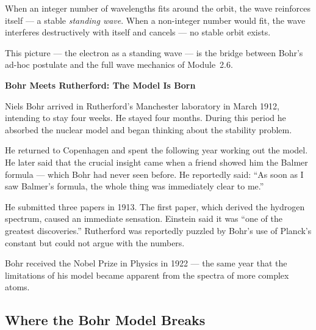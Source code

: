 \documentclass[12pt, a4paper]{book}
\newcommand{\newterm}[1]{\textit{\textcolor{DiscoveryColor}{#1}}}
\begin{document}
\vspace{0.5em}

When an integer number of wavelengths fits around the orbit,
the wave reinforces itself --- a stable \newterm{standing wave}.
When a non-integer number would fit, the wave interferes
destructively with itself and cancels --- no stable orbit exists.

This picture --- the electron as a standing wave ---
is the bridge between Bohr's ad-hoc postulate and the
full wave mechanics of Module~2.6.

\begin{historybox}
\textbf{Bohr Meets Rutherford: The Model Is Born}

Niels Bohr arrived in Rutherford's Manchester laboratory
in March 1912, intending to stay four weeks.
He stayed four months.
During this period he absorbed the nuclear model
and began thinking about the stability problem.

He returned to Copenhagen and spent the following year
working out the model.
He later said that the crucial insight came when a friend
showed him the Balmer formula --- which Bohr had never
seen before.
He reportedly said: ``As soon as I saw Balmer's formula,
the whole thing was immediately clear to me.''

He submitted three papers in 1913.
The first paper, which derived the hydrogen spectrum,
caused an immediate sensation.
Einstein said it was ``one of the greatest discoveries.''
Rutherford was reportedly puzzled by Bohr's use of
Planck's constant but could not argue with the numbers.

Bohr received the Nobel Prize in Physics in 1922 ---
the same year that the limitations of his model
became apparent from the spectra of more complex atoms.
\end{historybox}

\subsection*{Where the Bohr Model Breaks}
\end{document}
